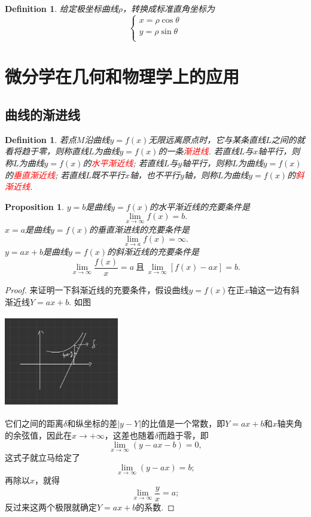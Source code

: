 \documentclass{article}
\newtheorem{proposition}[theorem]{Proposition}
\newtheorem{definition}[theorem]{Definition}
\newcommand{\redt}[1]{\textcolor{red}{#1}}
\begin{document}
\begin{definition}
\rm 给定极坐标曲线$\rho$，转换成标准直角坐标为
$$
\left\{
\begin{array}{ll}
x = \rho \cos \theta \\
y = \rho \sin \theta \\
\end{array} \right.
$$
\end{definition}




\newpage
\section{微分学在几何和物理学上的应用}

\subsection{曲线的渐进线}

\begin{definition}
\rm 若点$M$沿曲线$y=f(x)$无限远离原点时，它与某条直线$L$之间的就看将趋于零，则称直线$L$为曲线$y=f(x)$的一条\redt{渐进线}. 若直线$L$与$x$轴平行，则称$L$为曲线$y=f(x)$的\redt{水平渐近线}; 若直线$L$与$y$轴平行，则称$L$为曲线$y=f(x)$的\redt{垂直渐近线}; 若直线$L$既不平行$x$轴，也不平行$y$轴，则称$L$为曲线$y=f(x)$的\redt{斜渐近线}. 
\end{definition}

\begin{proposition}
\rm $y=b$是曲线$y=f(x)$的水平渐近线的充要条件是
$$
\lim\limits_{x \to \infty} f(x)= b.
$$
$x=a$是曲线$y=f(x)$的垂直渐进线的充要条件是
$$
\lim\limits_{x \to a} f(x) = \infty.
$$
$y=ax+b$是曲线$y=f(x)$的斜渐近线的充要条件是
$$
\lim\limits_{x \to \infty} \frac{f(x)}{x} = a ~\text{且}~ \lim\limits_{x \to  \infty} [f(x)-ax ] =b.
$$
\end{proposition}

\begin{proof}
来证明一下斜渐近线的充要条件，假设曲线$y=f(x)$在正$x$轴这一边有斜渐近线$Y=ax+b$. 如图
\begin{center}
\includegraphics[width=5cm, height=4cm]{images/asymptotic_line.jpg}
\end{center}
它们之间的距离$\delta$和纵坐标的差$|y-Y|$的比值是一个常数，即$Y=ax+b$和$x$轴夹角的余弦值，因此在$x \to +\infty$，这差也随着$\delta$而趋于零，即
$$
\lim\limits_{x \to \infty} (y-ax-b) = 0,
$$
这式子就立马给定了
$$
\lim\limits_{x \to \infty} (y-ax) =b;
$$
再除以$x$，就得
$$
\lim\limits_{x \to \infty} \frac{y}{x} = a;
$$
反过来这两个极限就确定$Y=ax+b$的系数. 
\end{proof}
\end{document}
